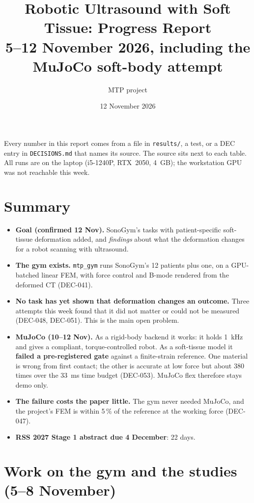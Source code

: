 \documentclass[11pt,a4paper]{article}
\title{Robotic Ultrasound with Soft Tissue: Progress Report\\[2pt]
\large 5--12 November 2026, including the MuJoCo soft-body attempt}
\author{MTP project}
\date{12 November 2026}
\newcommand{\src}[1]{\texttt{\small #1}}
\newcommand{\dec}[1]{\textsf{#1}}
\begin{document}
\maketitle

\noindent Every number in this report comes from a file in \src{results/}, a test, or a \dec{DEC} entry in
\src{DECISIONS.md} that names its source. The source sits next to each table. All runs are on the laptop
(i5-1240P, RTX~2050, 4~GB); the workstation GPU was not reachable this week.

\section*{Summary}
\begin{itemize}
  \item \textbf{Goal (confirmed 12 Nov).} SonoGym's tasks with patient-specific soft-tissue deformation added, and
    \emph{findings} about what the deformation changes for a robot scanning with ultrasound.
  \item \textbf{The gym exists.} \src{mtp\_gym} runs SonoGym's 12 patients plus one, on a GPU-batched linear FEM,
    with force control and B-mode rendered from the deformed CT (\dec{DEC-041}).
  \item \textbf{No task has yet shown that deformation changes an outcome.} Three attempts this week found that it did
    not matter or could not be measured (\dec{DEC-048}, \dec{DEC-051}). This is the main open problem.
  \item \textbf{MuJoCo (10--12 Nov).} As a rigid-body backend it works: it holds 1~kHz and gives a compliant,
    torque-controlled robot. As a soft-tissue model it \textbf{failed a pre-registered gate} against a
    finite-strain reference. One material is wrong from first contact; the other is accurate at low force but
    about 380 times over the 33~ms time budget (\dec{DEC-053}). MuJoCo flex therefore stays demo only.
  \item \textbf{The failure costs the paper little.} The gym never needed MuJoCo, and the project's FEM is within
    5\,\% of the reference at the working force (\dec{DEC-047}).
  \item \textbf{RSS 2027 Stage 1 abstract due 4 December}: 22 days.
\end{itemize}

\section{Work on the gym and the studies (5--8 November)}
\end{document}
